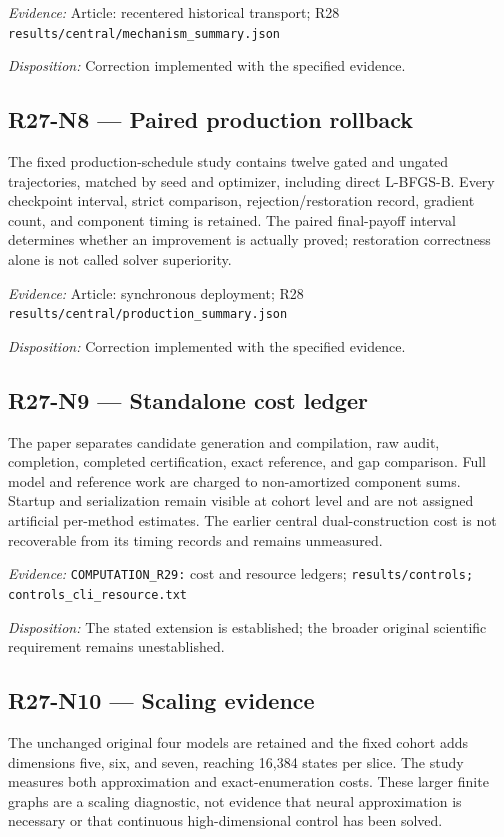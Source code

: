 \emph{Evidence:} Article: recentered historical transport; R28 \nolinkurl{results/central/mechanism_summary.json}

\emph{Disposition:} Correction implemented with the specified evidence.
\subsection{R27-N8 --- Paired production rollback}
The fixed production-schedule study contains twelve gated and ungated trajectories, matched by seed and optimizer, including direct L-BFGS-B. Every checkpoint interval, strict comparison, rejection/restoration record, gradient count, and component timing is retained. The paired final-payoff interval determines whether an improvement is actually proved; restoration correctness alone is not called solver superiority.

\emph{Evidence:} Article: synchronous deployment; R28 \nolinkurl{results/central/production_summary.json}

\emph{Disposition:} Correction implemented with the specified evidence.
\subsection{R27-N9 --- Standalone cost ledger}
The paper separates candidate generation and compilation, raw audit, completion, completed certification, exact reference, and gap comparison. Full model and reference work are charged to non-amortized component sums. Startup and serialization remain visible at cohort level and are not assigned artificial per-method estimates. The earlier central dual-construction cost is not recoverable from its timing records and remains unmeasured.

\emph{Evidence:} \nolinkurl{COMPUTATION_R29:} cost and resource ledgers; \nolinkurl{results/controls;} \nolinkurl{controls_cli_resource.txt}

\emph{Disposition:} The stated extension is established; the broader original scientific requirement remains unestablished.
\subsection{R27-N10 --- Scaling evidence}
The unchanged original four models are retained and the fixed cohort adds dimensions five, six, and seven, reaching 16,384 states per slice. The study measures both approximation and exact-enumeration costs. These larger finite graphs are a scaling diagnostic, not evidence that neural approximation is necessary or that continuous high-dimensional control has been solved.

